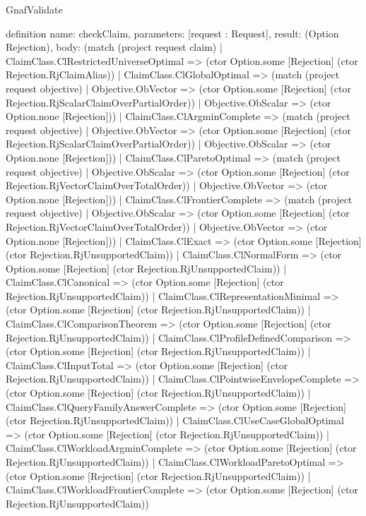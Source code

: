 \begin{lexlean}{GnafValidate}
\begin{semanticmodule}
definition{
  name: checkClaim,
  parameters: [request : Request],
  result: (Option Rejection),
  body: (match (project request claim)
    | ClaimClass.ClRestrictedUniverseOptimal => (ctor Option.some [Rejection] (ctor Rejection.RjClaimAlias))
    | ClaimClass.ClGlobalOptimal => (match (project request objective)
      | Objective.ObVector => (ctor Option.some [Rejection] (ctor Rejection.RjScalarClaimOverPartialOrder))
      | Objective.ObScalar => (ctor Option.none [Rejection]))
    | ClaimClass.ClArgminComplete => (match (project request objective)
      | Objective.ObVector => (ctor Option.some [Rejection] (ctor Rejection.RjScalarClaimOverPartialOrder))
      | Objective.ObScalar => (ctor Option.none [Rejection]))
    | ClaimClass.ClParetoOptimal => (match (project request objective)
      | Objective.ObScalar => (ctor Option.some [Rejection] (ctor Rejection.RjVectorClaimOverTotalOrder))
      | Objective.ObVector => (ctor Option.none [Rejection]))
    | ClaimClass.ClFrontierComplete => (match (project request objective)
      | Objective.ObScalar => (ctor Option.some [Rejection] (ctor Rejection.RjVectorClaimOverTotalOrder))
      | Objective.ObVector => (ctor Option.none [Rejection]))
    | ClaimClass.ClExact => (ctor Option.some [Rejection] (ctor Rejection.RjUnsupportedClaim))
    | ClaimClass.ClNormalForm => (ctor Option.some [Rejection] (ctor Rejection.RjUnsupportedClaim))
    | ClaimClass.ClCanonical => (ctor Option.some [Rejection] (ctor Rejection.RjUnsupportedClaim))
    | ClaimClass.ClRepresentationMinimal => (ctor Option.some [Rejection] (ctor Rejection.RjUnsupportedClaim))
    | ClaimClass.ClComparisonTheorem => (ctor Option.some [Rejection] (ctor Rejection.RjUnsupportedClaim))
    | ClaimClass.ClProfileDefinedComparison => (ctor Option.some [Rejection] (ctor Rejection.RjUnsupportedClaim))
    | ClaimClass.ClInputTotal => (ctor Option.some [Rejection] (ctor Rejection.RjUnsupportedClaim))
    | ClaimClass.ClPointwiseEnvelopeComplete => (ctor Option.some [Rejection] (ctor Rejection.RjUnsupportedClaim))
    | ClaimClass.ClQueryFamilyAnswerComplete => (ctor Option.some [Rejection] (ctor Rejection.RjUnsupportedClaim))
    | ClaimClass.ClUseCaseGlobalOptimal => (ctor Option.some [Rejection] (ctor Rejection.RjUnsupportedClaim))
    | ClaimClass.ClWorkloadArgminComplete => (ctor Option.some [Rejection] (ctor Rejection.RjUnsupportedClaim))
    | ClaimClass.ClWorkloadParetoOptimal => (ctor Option.some [Rejection] (ctor Rejection.RjUnsupportedClaim))
    | ClaimClass.ClWorkloadFrontierComplete => (ctor Option.some [Rejection] (ctor Rejection.RjUnsupportedClaim))
}
\end{semanticmodule}
\end{lexlean}
